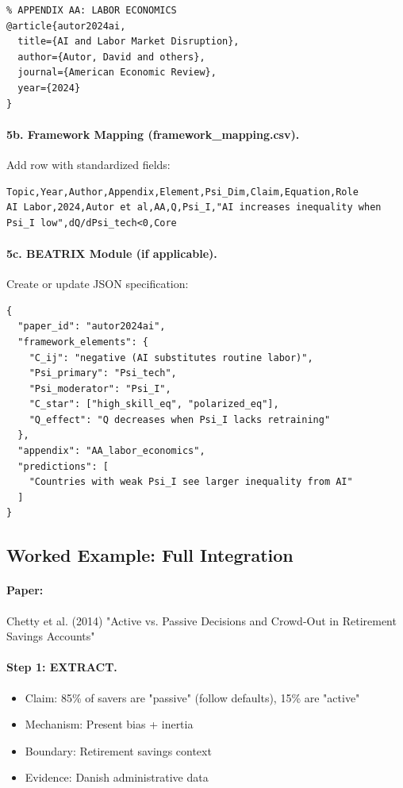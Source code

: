 \begin{verbatim}
% APPENDIX AA: LABOR ECONOMICS
@article{autor2024ai,
  title={AI and Labor Market Disruption},
  author={Autor, David and others},
  journal={American Economic Review},
  year={2024}
}
\end{verbatim}

\paragraph{5b. Framework Mapping (framework\_mapping.csv).}
Add row with standardized fields:

\begin{verbatim}
Topic,Year,Author,Appendix,Element,Psi_Dim,Claim,Equation,Role
AI Labor,2024,Autor et al,AA,Q,Psi_I,"AI increases inequality when Psi_I low",dQ/dPsi_tech<0,Core
\end{verbatim}

\paragraph{5c. BEATRIX Module (if applicable).}
Create or update JSON specification:

\begin{verbatim}
{
  "paper_id": "autor2024ai",
  "framework_elements": {
    "C_ij": "negative (AI substitutes routine labor)",
    "Psi_primary": "Psi_tech",
    "Psi_moderator": "Psi_I",
    "C_star": ["high_skill_eq", "polarized_eq"],
    "Q_effect": "Q decreases when Psi_I lacks retraining"
  },
  "appendix": "AA_labor_economics",
  "predictions": [
    "Countries with weak Psi_I see larger inequality from AI"
  ]
}
\end{verbatim}

\subsection{Worked Example: Full Integration}

\paragraph{Paper:} Chetty et al. (2014) "Active vs. Passive Decisions and Crowd-Out 
in Retirement Savings Accounts"

\paragraph{Step 1: EXTRACT.}
\begin{itemize}
  \item Claim: 85\% of savers are "passive" (follow defaults), 15\% are "active"
  \item Mechanism: Present bias + inertia
  \item Boundary: Retirement savings context
  \item Evidence: Danish administrative data
\end{itemize}

